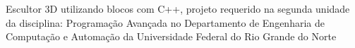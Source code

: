 Escultor 3D utilizando blocos com C++, projeto requerido na segunda unidade da disciplina\+: Programação Avançada no Departamento de Engenharia de Computação e Automação da Universidade Federal do Rio Grande do Norte 